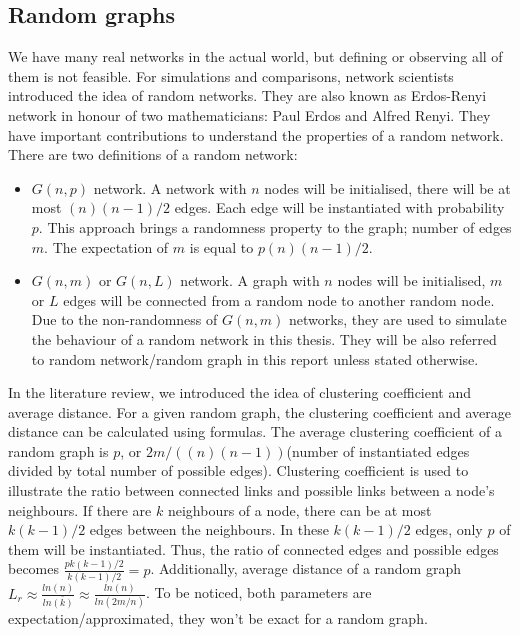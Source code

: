 \documentclass[12pt]{article}
\begin{document}
\subsection{Random graphs}
We have many real networks in the actual world, but defining or observing all of them is not feasible. For simulations and comparisons, network scientists introduced the idea of random networks. They are also known as Erdos-Renyi network in honour of two mathematicians: Paul Erdos and Alfred Renyi. They have important contributions to understand the properties of a random network\cite{barabási2016network}.\\
\noindent
There are two definitions of a random network:
\begin{itemize}
    \item $G(n,p)$ network. A network with $n$ nodes will be initialised, there will be at most $(n)(n-1)/2$ edges. Each edge will be instantiated with probability $p$. This approach brings a randomness property to the graph; number of edges $m$. The expectation of $m$ is equal to $p(n)(n-1)/2$.
    \item $G(n,m)$ or $G(n,L)$ network. A graph with $n$ nodes will be initialised, $m$ or $L$ edges will be connected from a random node to another random node. Due to the non-randomness of $G(n,m)$ networks, they are used to simulate the behaviour of a random network in this thesis. They will be also referred to random network/random graph in this report unless stated otherwise.
\end{itemize}

\noindent
In the literature review, we introduced the idea of clustering coefficient and average distance. For a given random graph, the clustering coefficient and average distance can be calculated using formulas.\cite{barabási2016network} The average clustering coefficient of a random graph is $p$, or $2m/((n)(n-1))$(number of instantiated edges divided by total number of possible edges). Clustering coefficient is used to illustrate the ratio between connected links and possible links between a node's neighbours. If there are $k$ neighbours of a node, there can be at most $k(k-1)/2$ edges between the neighbours. In these $k(k-1)/2$ edges, only $p$ of them will be instantiated. Thus, the ratio of connected edges and possible edges becomes $\frac{pk(k-1)/2}{k(k-1)/2}=p$. Additionally, average distance of a random graph $L_r \approx \frac{ln(n)}{ln\bar{(k)}}\approx \frac{ln(n)}{ln(2m/n)}$. To be noticed, both parameters are expectation/approximated, they won't be exact for a random graph.
\end{document}

